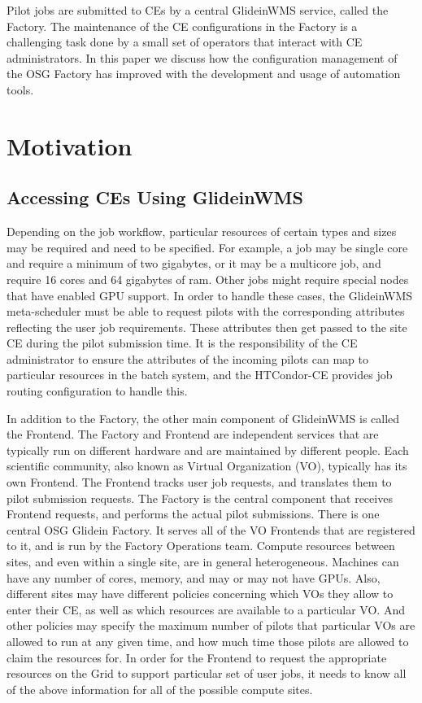 \documentclass[manuscript,screen,review]{acmart}
\begin{document}
Pilot jobs are submitted to CEs by a central GlideinWMS service, called the Factory. The maintenance of the CE configurations in the Factory is a challenging task done by a small set of operators that interact with CE administrators. In this paper we discuss how the configuration management of the OSG Factory has improved with the development and usage of automation tools.

\section{Motivation}


\subsection{Accessing CEs Using GlideinWMS}

Depending on the job workflow, particular resources of certain types and sizes may be required and need to be specified. For example, a job may be single core and require a minimum of two gigabytes, or it may be a multicore job, and require 16 cores and 64 gigabytes of ram. Other jobs might require special nodes that have enabled GPU support. In order to handle these cases, the GlideinWMS meta-scheduler must be able to request pilots with the corresponding attributes reflecting the user job requirements. These attributes then get passed to the site CE during the pilot submission time. It is the responsibility of the CE administrator to ensure the attributes of the incoming pilots can map to particular resources in the batch system, and the HTCondor-CE provides job routing configuration to handle this.

In addition to the Factory, the other main component of GlideinWMS is called the Frontend. The Factory and Frontend are independent services that are typically run on different hardware and are maintained by different people. Each scientific community, also known as Virtual Organization (VO), typically has its own Frontend. The Frontend tracks user job requests, and translates them to pilot submission requests. The Factory is the central component that receives Frontend requests, and performs the actual pilot submissions. There is one central OSG Glidein Factory. It serves all of the VO Frontends that are registered to it, and is run by the Factory Operations team. 
Compute resources between sites, and even within a single site, are in general heterogeneous. Machines can have any number of cores, memory, and may or may not have GPUs. Also, different sites may have different policies concerning which VOs they allow to enter their CE, as well as which resources are available to a particular VO. And other policies may specify the maximum number of pilots that particular VOs are allowed to run at any given time, and how much time those pilots are allowed to claim the resources for.
In order for the Frontend to request the appropriate resources on the Grid to support particular set of user jobs, it needs to know all of the above information for all of the possible compute sites.
\end{document}
